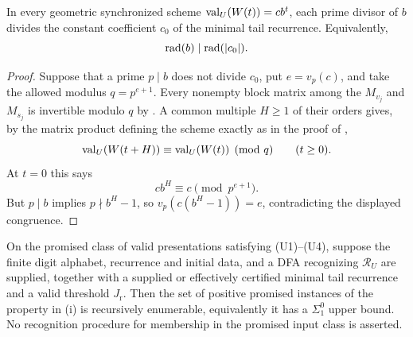 \begin{lemma}
  \label{lem:geometric-ratio-tail-support}
  In every geometric synchronized scheme
  \(\operatorname{val}_U(W(t))=cb^t\), each prime divisor of \(b\) divides the
  constant coefficient \(c_0\) of the minimal tail recurrence.  Equivalently,
  \[
    \operatorname{rad}(b)\mid\operatorname{rad}(\lvert c_0 \rvert).
  \]
\end{lemma}

\begin{proof}
  Suppose that a prime \(p\mid b\) does not divide \(c_0\), put
  \(e=v_p(c)\), and take the allowed modulus \(q=p^{e+1}\).  Every
  nonempty block matrix among the \(M_{v_j}\) and \(M_{s_j}\) is invertible
  modulo \(q\) by .  A common
  multiple \(H\ge1\) of their orders gives, by the matrix product defining
  the scheme exactly as in the proof of
  ,
  \[
    \operatorname{val}_U(W(t+H))\equiv\operatorname{val}_U(W(t))\pmod q
    \qquad(t\ge0).
  \]
  At \(t=0\) this says
  \[
    cb^H\equiv c\pmod {p^{e+1}}.
  \]
  But \(p\mid b\) implies \(p\nmid b^H-1\), so
  \(v_p(c(b^H-1))=e\), contradicting the displayed congruence.
\end{proof}

\begin{corollary}
  \label{cor:bounded-outside-support-semidecidable}
  On the promised class of valid presentations satisfying
  \textup{(U1)--(U4)}, suppose the finite digit alphabet, recurrence and
  initial data, and a DFA recognizing \(\mathcal R_U\) are supplied,
  together with a supplied or effectively certified minimal tail
  recurrence and a valid threshold \(J_{\mathrm r}\). Then the set of
  positive promised instances of the property in
  \textup{(i)} is
  recursively enumerable, equivalently it has a \(\Sigma^0_1\) upper
  bound. No recognition procedure for membership in the promised input
  class is asserted.
\end{corollary}

